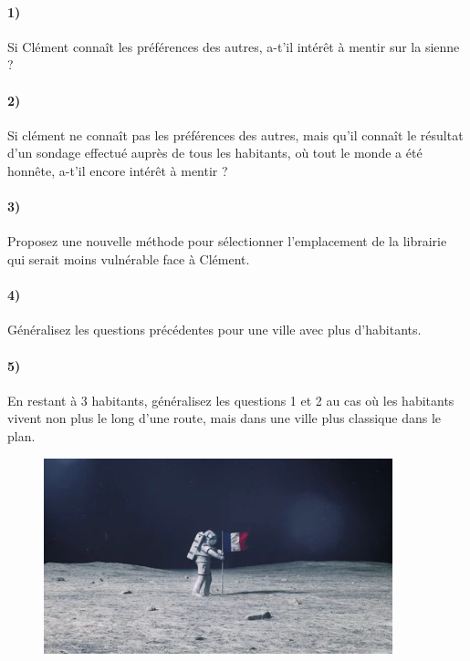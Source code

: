 \documentclass[a4paper,10pt,oneside]{article}
\begin{document}
\paragraph*{1)} 
Si Clément connaît les préférences des autres, a-t'il intérêt à mentir sur la sienne ?

\paragraph*{2)} 
Si clément ne connaît pas les préférences des autres, mais qu'il connaît le résultat d'un sondage effectué auprès de tous les habitants, où tout le monde a été honnête, a-t'il encore intérêt à mentir ?

\paragraph*{3)} 
Proposez une nouvelle méthode pour sélectionner l'emplacement de la librairie qui serait moins vulnérable face à Clément.

\paragraph*{4)} 
Généralisez les questions précédentes pour une ville avec plus d'habitants.

\paragraph*{5)} 
En restant à 3 habitants, généralisez les questions 1 et 2 au cas où les habitants vivent non plus le long d'une route, mais dans une ville plus classique dans le plan. 


\vspace{3cm}
\begin{figure}[!ht]
  \centering
  \includegraphics[width=0.9\textwidth]{figures/flag.png}
\end{figure}
\end{document}
